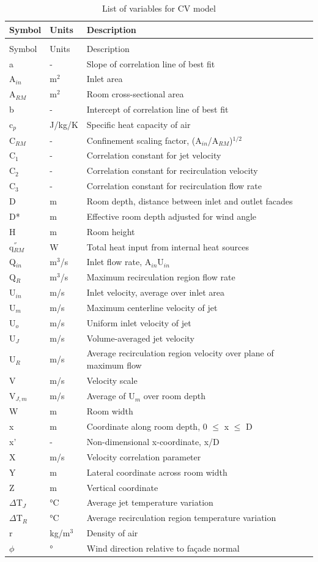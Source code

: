 \begin{longtable}[c]{p{1.0in}p{1.0in}p{3.5in}}
\caption{List of variables for CV model \label{table:list-of-variables-for-cv-model}} \tabularnewline
\toprule
Symbol & Units & Description \tabularnewline
\midrule
\endfirsthead

\caption[]{List of variables for CV model} \tabularnewline
\toprule
Symbol & Units & Description \tabularnewline
\midrule
\endhead

a & - & Slope of correlation line of best fit \tabularnewline
A\(_{in}\) & m\(^2\) & Inlet area \tabularnewline
A\(_{RM}\) & m\(^2\) & Room cross-sectional area \tabularnewline
b & - & Intercept of correlation line of best fit \tabularnewline
c\(_{p}\) & J/kg/K & Specific heat capacity of air \tabularnewline
C\(_{RM}\) & - & Confinement scaling factor, (A\(_{in}\)/A\(_{RM}\))\(^{1/2}\) \tabularnewline
C\(_{1}\) & - & Correlation constant for jet velocity \tabularnewline
C\(_{2}\) & - & Correlation constant for recirculation velocity \tabularnewline
C\(_{3}\) & - & Correlation constant for recirculation flow rate \tabularnewline
D & m & Room depth, distance between inlet and outlet facades \tabularnewline
D* & m & Effective room depth adjusted for wind angle \tabularnewline
H & m & Room height \tabularnewline
q\(^{''}_{RM}\) & W & Total heat input from internal heat sources \tabularnewline
Q\(_{in}\) & m\(^3\)/s & Inlet flow rate, A\(_{in}\)U\(_{in}\) \tabularnewline
Q\(_R\) & m\(^3\)/s & Maximum recirculation region flow rate \tabularnewline
U\(_{in}\) & m/s & Inlet velocity, average over inlet area \tabularnewline
U\(_{m}\) & m/s & Maximum centerline velocity of jet \tabularnewline
U\(_{o}\) & m/s & Uniform inlet velocity of jet \tabularnewline
U\(_{J}\) & m/s & Volume-averaged jet velocity \tabularnewline
U\(_{R}\) & m/s & Average recirculation region velocity over plane of maximum flow \tabularnewline
V & m/s & Velocity scale \tabularnewline
V\(_{J,m}\) & m/s & Average of U\(_{m}\) over room depth \tabularnewline
W & m & Room width \tabularnewline
x & m & Coordinate along room depth, 0 $\leq$ x $\leq$ D \tabularnewline
x' & - & Non-dimensional x-coordinate, x/D \tabularnewline
X & m/s & Velocity correlation parameter \tabularnewline
Y & m & Lateral coordinate across room width \tabularnewline
Z & m & Vertical coordinate \tabularnewline
$\Delta$T\(_{J}\) & °C & Average jet temperature variation \tabularnewline
$\Delta$T\(_{R}\) & °C & Average recirculation region temperature variation \tabularnewline
r & kg/m\(^3\) & Density of air \tabularnewline
$\phi$ & ° & Wind direction relative to façade normal \tabularnewline
\bottomrule
\end{longtable}

